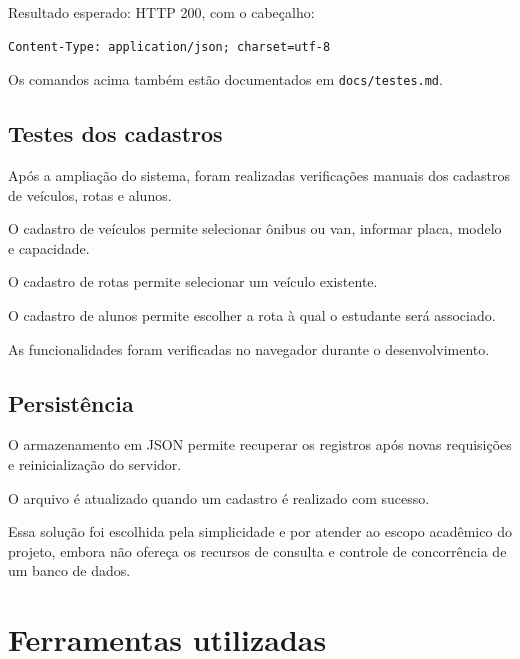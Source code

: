 \documentclass[12pt,a4paper]{article}
\begin{document}
Resultado esperado: HTTP 200, com o cabeçalho:

\begin{lstlisting}
Content-Type: application/json; charset=utf-8
\end{lstlisting}

Os comandos acima também estão documentados em \texttt{docs/testes.md}.

\subsection{Testes dos cadastros}

Após a ampliação do sistema, foram realizadas verificações manuais dos cadastros de veículos, rotas e alunos.

O cadastro de veículos permite selecionar ônibus ou van, informar placa, modelo e capacidade.

O cadastro de rotas permite selecionar um veículo existente.

O cadastro de alunos permite escolher a rota à qual o estudante será associado.

As funcionalidades foram verificadas no navegador durante o desenvolvimento.

\subsection{Persistência}

O armazenamento em JSON permite recuperar os registros após novas requisições e reinicialização do servidor.

O arquivo é atualizado quando um cadastro é realizado com sucesso.

Essa solução foi escolhida pela simplicidade e por atender ao escopo acadêmico do projeto, embora não ofereça os recursos de consulta e controle de concorrência de um banco de dados.

\section{Ferramentas utilizadas}
\end{document}
